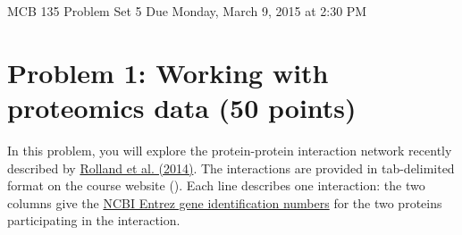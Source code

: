\documentclass{article}
\begin{document}
\large

MCB 135 Problem Set 5 \hfill Due Monday, March 9, 2015 at 2:30 PM

\section*{Problem 1: Working with proteomics data (50 points)}

In this problem, you will explore the protein-protein interaction network recently described by \linebreak \href{http://www.cell.com/abstract/S0092-8674\%2814\%2901422-6}{Rolland et al. (2014)}. The interactions are provided in tab-delimited format on the course \linebreak website (). Each line describes one interaction: the two columns give the \href{http://www.ncbi.nlm.nih.gov/gene}{NCBI \linebreak Entrez gene identification numbers} for the two proteins participating in the interaction.
\end{document}

